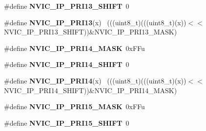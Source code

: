 \begin{DoxyCompactItemize}
\item 
\hypertarget{group___n_v_i_c___register___masks_ga8324ec7c81e9340bde17fb528d5d2cc8}{}\#define {\bfseries N\+V\+I\+C\+\_\+\+I\+P\+\_\+\+P\+R\+I13\+\_\+\+S\+H\+I\+F\+T}~0\label{group___n_v_i_c___register___masks_ga8324ec7c81e9340bde17fb528d5d2cc8}

\item 
\hypertarget{group___n_v_i_c___register___masks_ga173de4611fc3da177afdb94a58e45aa6}{}\#define {\bfseries N\+V\+I\+C\+\_\+\+I\+P\+\_\+\+P\+R\+I13}(x)                                              ~(((uint8\+\_\+t)(((uint8\+\_\+t)(x))$<$$<$N\+V\+I\+C\+\_\+\+I\+P\+\_\+\+P\+R\+I13\+\_\+\+S\+H\+I\+F\+T))\&N\+V\+I\+C\+\_\+\+I\+P\+\_\+\+P\+R\+I13\+\_\+\+M\+A\+S\+K)\label{group___n_v_i_c___register___masks_ga173de4611fc3da177afdb94a58e45aa6}

\item 
\hypertarget{group___n_v_i_c___register___masks_ga3e36f642e1164dfe6743152bea991661}{}\#define {\bfseries N\+V\+I\+C\+\_\+\+I\+P\+\_\+\+P\+R\+I14\+\_\+\+M\+A\+S\+K}~0x\+F\+Fu\label{group___n_v_i_c___register___masks_ga3e36f642e1164dfe6743152bea991661}

\item 
\hypertarget{group___n_v_i_c___register___masks_gafcfefb4bfe834f3140d66a4fbe8ad691}{}\#define {\bfseries N\+V\+I\+C\+\_\+\+I\+P\+\_\+\+P\+R\+I14\+\_\+\+S\+H\+I\+F\+T}~0\label{group___n_v_i_c___register___masks_gafcfefb4bfe834f3140d66a4fbe8ad691}

\item 
\hypertarget{group___n_v_i_c___register___masks_ga3e91c7ddeef52937eda5d7bea99ccaec}{}\#define {\bfseries N\+V\+I\+C\+\_\+\+I\+P\+\_\+\+P\+R\+I14}(x)                                              ~(((uint8\+\_\+t)(((uint8\+\_\+t)(x))$<$$<$N\+V\+I\+C\+\_\+\+I\+P\+\_\+\+P\+R\+I14\+\_\+\+S\+H\+I\+F\+T))\&N\+V\+I\+C\+\_\+\+I\+P\+\_\+\+P\+R\+I14\+\_\+\+M\+A\+S\+K)\label{group___n_v_i_c___register___masks_ga3e91c7ddeef52937eda5d7bea99ccaec}

\item 
\hypertarget{group___n_v_i_c___register___masks_gaa1fc3277dd8dde0dceb9bc3efbe25b3c}{}\#define {\bfseries N\+V\+I\+C\+\_\+\+I\+P\+\_\+\+P\+R\+I15\+\_\+\+M\+A\+S\+K}~0x\+F\+Fu\label{group___n_v_i_c___register___masks_gaa1fc3277dd8dde0dceb9bc3efbe25b3c}

\item 
\hypertarget{group___n_v_i_c___register___masks_gade7196abb0ec453091181bc50e0920ce}{}\#define {\bfseries N\+V\+I\+C\+\_\+\+I\+P\+\_\+\+P\+R\+I15\+\_\+\+S\+H\+I\+F\+T}~0\label{group___n_v_i_c___register___masks_gade7196abb0ec453091181bc50e0920ce}


\end{DoxyCompactItemize}

